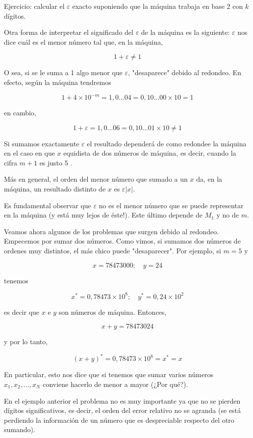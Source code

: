 \documentclass[10pt]{article}
\begin{document}
Ejercicio: calcular el $\varepsilon$ exacto suponiendo que la máquina trabaja en base 2 con $k$ dígitos.

Otra forma de interpretar el significado del $\varepsilon$ de la máquina es la siguiente: $\varepsilon$ nos dice cuál es el menor número tal que, en la máquina,

$$
1+\varepsilon \neq 1
$$

O sea, si se le suma a 1 algo menor que $\varepsilon$, "desaparece" debido al redondeo. En efecto, según la máquina tendremos

$$
1+4 \times 10^{-m}=1,0 \ldots 04=0,10 \ldots 00 \times 10=1
$$

en cambio,

$$
1+\varepsilon=1,0 \ldots 06=0,10 \ldots 01 \times 10 \neq 1
$$

Si sumamos exactamente $\varepsilon$ el resultado dependerá de como redondee la máquina en el caso en que $x$ equidista de dos números de máquina, es decir, cuando la cifra $m+1$ es justo 5 .

Más en general, el orden del menor número que sumado a un $x$ da, en la máquina, un resultado distinto de $x$ es $\varepsilon|x|$.

Es fundamental observar que $\varepsilon$ no es el menor número que se puede representar en la máquina (y está muy lejos de éste!). Este último depende de $M_{1}$ y no de $m$.

Veamos ahora algunos de los problemas que surgen debido al redondeo.\\
Empecemos por sumar dos números. Como vimos, si sumamos dos números de ordenes muy distintos, el más chico puede "desaparecer". Por ejemplo, si $m=5$ y

$$
x=78473000 ; \quad y=24
$$

tenemos

$$
x^{*}=0,78473 \times 10^{8} ; \quad y^{*}=0,24 \times 10^{2}
$$

es decir que $x$ e $y$ son números de máquina. Entonces,

$$
x+y=78473024
$$

y por lo tanto,

$$
(x+y)^{*}=0,78473 \times 10^{8}=x^{*}=x
$$

En particular, esto nos dice que si tenemos que sumar varios números $x_{1}, x_{2}, \ldots, x_{N}$ conviene hacerlo de menor a mayor (¿Por qué?).

En el ejemplo anterior el problema no es muy importante ya que no se pierden dígitos significativos, es decir, el orden del error relativo no se agranda (se está perdiendo la información de un número que es despreciable respecto del otro sumando).
\end{document}
